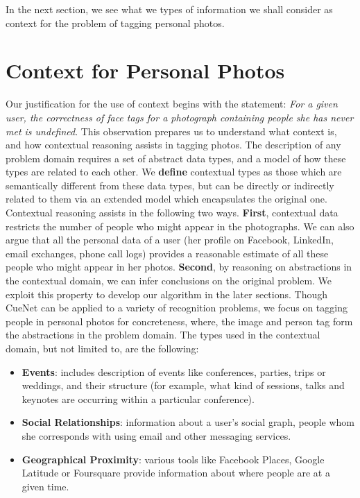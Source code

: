 In the next section, we see what we types of information we shall consider as context for the problem of tagging personal photos.

\section{Context for Personal Photos}
Our justification for the use of context begins with the statement: \textit{For a given user, the correctness of face tags for a photograph containing people she has never met is undefined}. This observation prepares us to understand what context is, and how contextual reasoning assists in tagging photos. The description of any problem domain requires a set of abstract data types, and a model of how these types are related to each other. We \textbf{define} contextual types as those which are semantically different from these data types, but can be directly or indirectly related to them via an extended model which encapsulates the original one. Contextual reasoning assists in the following two ways. \textbf{First}, contextual data restricts the number of people who might appear in the photographs. We can also argue that all the personal data of a user (her profile on Facebook, LinkedIn, email exchanges, phone call logs) provides a reasonable estimate of all these people who might appear in her photos. \textbf{Second}, by reasoning on abstractions in the contextual domain, we can infer conclusions on the original problem. We exploit this property to develop our algorithm in the later sections. Though CueNet can be applied to a variety of recognition problems, we focus on tagging people in personal photos for concreteness, where, the image and person tag form the abstractions in the problem domain. The types used in the contextual domain, but not limited to, are the following:

\begin{itemize}
\item \textbf{Events}: includes description of events like conferences, parties, trips or weddings, and their structure (for example, what kind of sessions, talks and keynotes are occurring within a particular conference).
\item \textbf{Social Relationships}: information about a user's social graph, people whom she corresponds with using email and other messaging services.
\item \textbf{Geographical Proximity}: various tools like Facebook Places, Google Latitude or Foursquare provide information about where people are at a given time.
\end{itemize}

